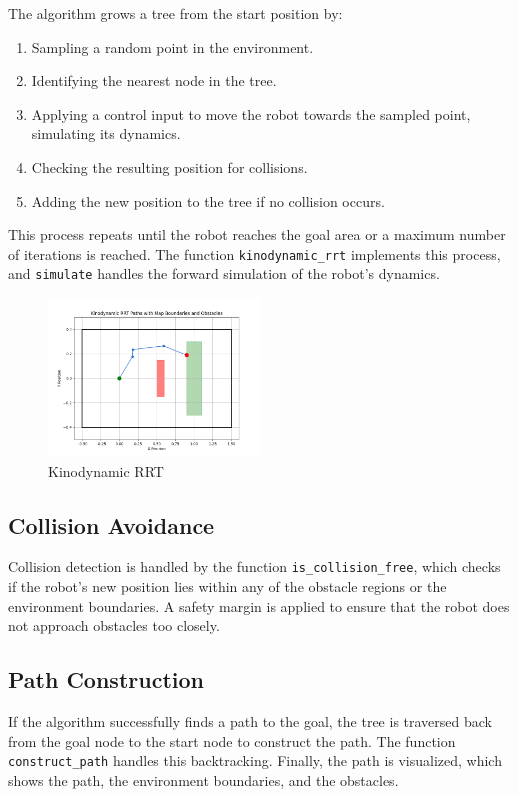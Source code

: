 \documentclass[12pt]{article}
\begin{document}
The algorithm grows a tree from the start position by:
\begin{enumerate}
    \item Sampling a random point in the environment.
    \item Identifying the nearest node in the tree.
    \item Applying a control input to move the robot towards the sampled point, simulating its dynamics.
    \item Checking the resulting position for collisions.
    \item Adding the new position to the tree if no collision occurs.
\end{enumerate}

This process repeats until the robot reaches the goal area or a maximum number of iterations is reached. The function \texttt{kinodynamic\_rrt} implements this process, and \texttt{simulate} handles the forward simulation of the robot’s dynamics.
    
\begin{figure}[h]
    \centering
      \includegraphics[width=0.5\textwidth]{./images/path.png}
      \caption{Kinodynamic RRT}
      \label{fig:sample_image}
    \end{figure}
    
\subsection{Collision Avoidance}
Collision detection is handled by the function \texttt{is\_collision\_free}, which checks if the robot’s new position lies within any of the obstacle regions or the environment boundaries. A safety margin is applied to ensure that the robot does not approach obstacles too closely.

\subsection{Path Construction}
If the algorithm successfully finds a path to the goal, the tree is traversed back from the goal node to the start node to construct the path. The function \texttt{construct\_path} handles this backtracking. Finally, the path is visualized, which shows the path, the environment boundaries, and the obstacles.
\end{document}
